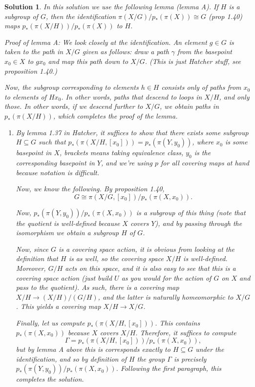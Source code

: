 \documentclass{article}
\theoremstyle{plain}
\theoremstyle{nonumberplain}
\newtheorem{sol}{Solution}
\begin{document}
\begin{sol}
In this solution we use the following lemma (lemma A). If $H$ is a subgroup of $G$, then the identification $\pi(X/G)/p_*(\pi(X)) \cong G$ (prop 1.40) maps $p_*(\pi(X/H))/p_*(\pi(X))$ to $H$.

Proof of lemma A: We look closely at the identification. An element $g \in G$ is taken to the path in $X/G$ given as follows: draw a path $\gamma$ from the basepoint $x_0 \in X$ to $g x_0$ and map this path down to $X/G$. (This is just Hatcher stuff, see proposition 1.40.)

Now, the subgroup corresponding to elements $h \in H$ consists only of paths from $x_0$ to elements of $H x_0$. In other words, paths that descend to loops in $X/H$, and only those. In other words, if we descend further to $X/G$, we obtain paths in $p_*(\pi(X/H))$, which completes the proof of the lemma.

\leavevmode
\begin{enumerate}
\item By lemma 1.37 in Hatcher, it suffices to show that there exists some subgroup $H \subseteq G$ such that $p_*(\pi(X/H, [x_0])) = p_*(\pi(Y,y_0))$, where $x_0$ is some basepoint in $X$, brackets means taking equivalence class, $y_0$ is the corresponding basepoint in $Y$, and we're using $p$ for all covering maps at hand because notation is difficult.

Now, we know the following. By proposition 1.40,
\begin{equation}
G \cong \pi(X/G, [x_0])/p_*(\pi(X,x_0)).
\end{equation}

Now, $p_*(\pi(Y,y_0))/p_*(\pi(X,x_0))$ is a subgroup of this thing (note that the quotient is well-defined because $X$ covers $Y$), and by passing through the isomorphism we obtain a subgroup $H$ of $G$.

Now, since $G$ is a covering space action, it is obvious from looking at the definition that $H$ is as well, so the covering space $X/H$ is well-defined. Moreover, $G/H$ acts on this space, and it is also easy to see that this is a covering space action (just build $U$ as you would for the action of $G$ on $X$ and pass to the quotient). As such, there is a covering map $X/H \to (X/H)/(G/H)$, and the latter is naturally homeomorphic to $X/G$. This yields a covering map $X/H \to X/G$.

Finally, let us compute $p_*(\pi(X/H,[x_0]))$. This contains $p_*(\pi(X,x_0))$ because $X$ covers $X/H$. Therefore, it suffices to compute
\begin{equation}
\Gamma = p_*(\pi(X/H, [x_0]))/p_*(\pi(X,x_0)),
\end{equation}
but by lemma A above this is corresponds exactly to $H \subseteq G$ under the identification, and so by definition of $H$ the group $\Gamma$ is precisely $p_*(\pi(Y,y_0))/p_*(\pi(X,x_0))$. Following the first paragraph, this completes the solution.


\end{enumerate}
\end{sol}
\end{document}
